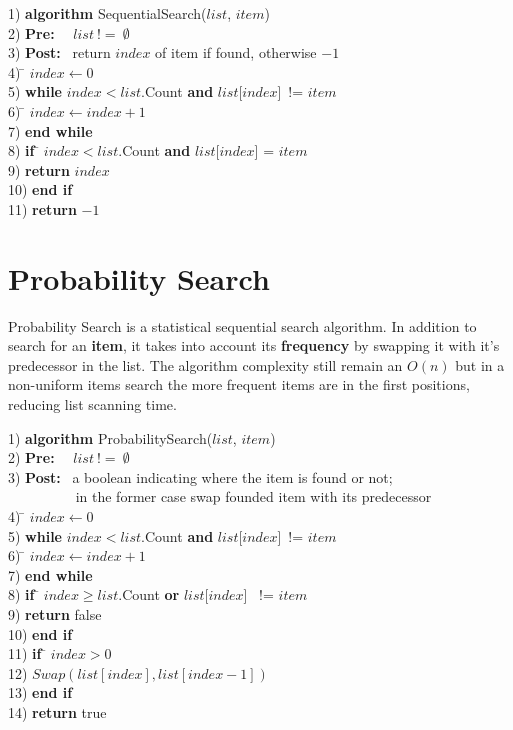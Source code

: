 \documentclass[10pt,oneside,a4paper]{report}
\begin{document}
\begin{tabbing}
1) \textbf{alg}\= \textbf{orithm} SequentialSearch($list$, $item$)\\
2) \> \textbf{Pre:}~~ $list~!=~\emptyset$ \\
3) \> \textbf{Post:}~ return $index$ of item if found, otherwise $-1$ \\
4) \> \= $index \leftarrow 0$ \\
5) \> \textbf{whi}\= \textbf{le} $index < list$.Count  \textbf{and} $list$[$index$]~!= $item$ \\
6) \> \> \= $index \leftarrow index+1$ \\
7) \> \textbf{end while} \\
8) \> \textbf{if }\= $ index < list$.Count  \textbf{and} $list$[$index$] = $item$ \\
9) \> \> \textbf{return} $index$ \\
10)\> \textbf{end if} \\
11)\> \textbf{return} $-1$ \\ 

\end{tabbing}

\section{Probability Search}
Probability Search is a statistical sequential search algorithm. In addition to search for an \textbf{item}, it takes into account its \textbf{frequency} by swapping it with it's predecessor in the list. The algorithm complexity still remain an $O(n)$ but in a non-uniform items search the more frequent items are in the first positions, reducing list scanning time.
\begin{tabbing}
1) \textbf{alg}\= \textbf{orithm} ProbabilitySearch($list$, $item$)\\
2) \> \textbf{Pre:}~~ $list~!=~\emptyset$ \\
3) \> \textbf{Post:}~ a boolean indicating where the item is found or not;\\
   \>~~~~~~~~~ in the former case swap founded item with its predecessor \\
4) \> \= $index \leftarrow 0$ \\
5) \> \textbf{whi}\= \textbf{le} $index < list$.Count  \textbf{and} $list$[$index$]~!= $item$ \\
6) \> \> \= $index \leftarrow index+1$ \\
7) \> \textbf{end while} \\
8) \> \textbf{if }\= $ index \geq list$.Count  \textbf{or} $list$[$index$] ~!= $item$ \\
9) \> \> \textbf{return} false \\
10)\> \textbf{end if} \\
11)\> \textbf{if }\= $ index > 0$ \\
12)\> \> $Swap(list[index], list[index-1])$ \\
13)\> \textbf{end if } \\
14)\> \textbf{return} true \\ 

\end {tabbing}
\end{document}
